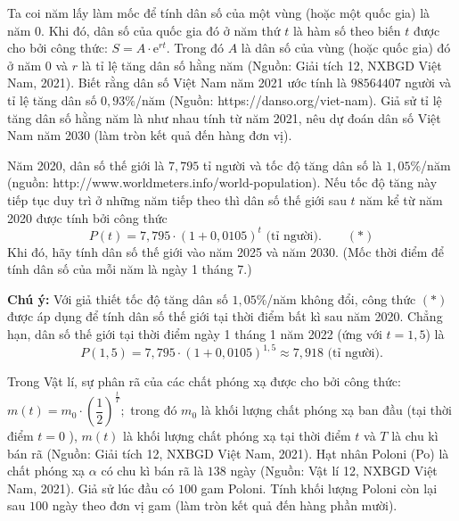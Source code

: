 \begin{vd}%
	Ta coi năm lấy làm mốc để tính dân số của một vùng (hoặc một quốc gia) là năm 0. Khi đó, dân số của quốc gia đó ở năm thứ $t$ là hàm số theo biến $t$ được cho bởi công thức: $S=A \cdot \mathrm{e}^{rt}$. Trong đó $A$ là dân số của vùng (hoặc quốc gia) đó ở năm 0 và $r$ là tỉ lệ tăng dân số hằng năm (Nguồn: Giải tích 12, NXBGD Việt Nam, 2021). Biết rằng dân số Việt Nam năm 2021 ước tính là $98564407$ người và tỉ lệ tăng dân số $0,93\%$/năm (Nguồn: https://danso.org/viet-nam). Giả sử tỉ lệ tăng dân số hằng năm là như nhau tính từ năm 2021, nêu dự đoán dân số Việt Nam năm 2030 (làm tròn kết quả đến hàng đơn vị).
\end{vd}
\begin{vd} %
	Năm 2020, dân số thế giới là $7{,}795$ tỉ người và tốc độ tăng dân số là $1{,}05$\%/năm (nguồn: http://www.worldmeters.info/world-population). Nếu tốc độ tăng này tiếp tục duy trì ở những năm tiếp theo thì dân số thế giới sau $t$ năm kể từ năm 2020 được tính bởi công thức
	$$P(t)=7{,}795\cdot(1+0{,}0105)^t\text{ (tỉ người).}\qquad(*)$$
	Khi đó, hãy tính dân số thế giới vào năm 2025 và năm 2030. (Mốc thời điểm để tính dân số của mỗi năm là ngày 1 tháng 7.)
\end{vd}
\textbf{Chú ý:} Với giả thiết tốc độ tăng dân số $1{,}05$\%/năm không đổi, công thức $(*)$ được áp dụng để tính dân số thế giới tại thời điểm bất kì sau năm 2020. Chẳng hạn, dân số thế giới tại thời điểm ngày 1 tháng 1 năm 2022 (ứng với $t=1{,}5$) là 
$$P(1{,}5)=7{,}795\cdot(1+0{,}0105)^{1{,}5}\approx7{,}918\text{ (tỉ người).}$$


\begin{vd}%
	Trong Vật lí, sự phân rã của các chất phóng xạ được cho bởi công thức: $m(t)=m_0 \cdot\left(\dfrac{1}{2}\right)^{\tfrac{t}{T}} ;$ trong đó $m_0$ là khối lượng chất phóng xạ ban đầu (tại thời điểm $t=0$ ), $m(t)$ là khối lượng chất phóng xạ tại thời điểm $t$ và $T$ là chu kì bán rã (Nguồn: Giải tích 12, NXBGD Việt Nam, 2021). Hạt nhân Poloni (Po) là chất phóng xạ $\alpha$ có chu kì bán rã là $138$ ngày (Nguồn: Vật lí 12, NXBGD Việt Nam, 2021). Giả sử lúc đầu có $100$ gam Poloni. Tính khối lượng Poloni còn lại sau $100$ ngày theo đơn vị gam (làm tròn kết quả đến hàng phần mười).
\end{vd}

